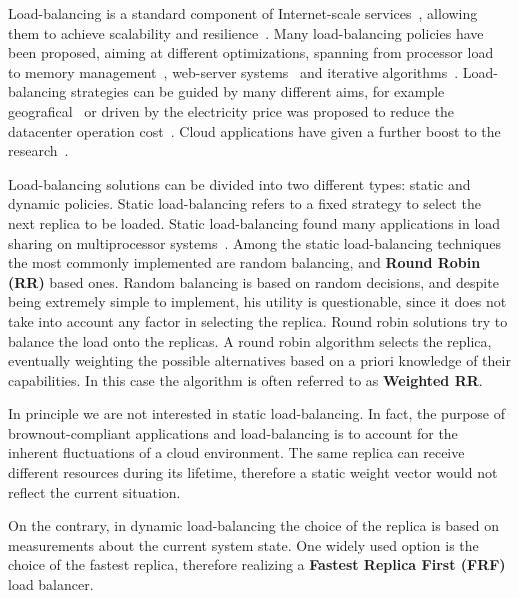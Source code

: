 Load-balancing is a standard component of Internet-scale 
services~\cite{WangOSDI}, allowing them to achieve scalability and
resilience~\citep{Barroso09,Hamilton07:LISA,clusteredbalancing}. Many
load-balancing policies have been proposed, aiming at different
optimizations, spanning from processor load~\cite{Stankovic:TC} to
memory management~\cite{PattersonMemoryLB,MemoryLBACC}, web-server
systems~\cite{Cardellini2003} and iterative 
algorithms~\cite{BahiIterative}. Load-balancing strategies can be 
guided by many different aims, for example
geografical~\cite{GeograficalSASO,geographicalwanbalancing} or driven
by the electricity price was proposed to reduce the datacenter
operation cost~\cite{LoadBalancingForElectricity:TCC}. Cloud
applications have given a further boost to the
research~\citep{Barroso09,Lu11:PerfEval,Lin12:IGCC}.


Load-balancing solutions can be divided into two different types:
static and dynamic policies. Static load-balancing refers to a fixed
strategy to select the next replica to be loaded. Static
load-balancing found many applications in load sharing on
multiprocessor
systems~\cite{StaticLoadBalancing:TSE,StaticOptimal:ACM}. Among the
static load-balancing techniques the most commonly implemented are
random balancing, and \textbf{Round Robin (RR)} based ones. Random
balancing is based on random decisions, and despite being extremely
simple to implement, his utility is questionable, since it does not
take into account any factor in selecting the replica. Round robin
solutions try to balance the load onto the replicas. A round robin
algorithm selects the replica, eventually weighting the possible
alternatives based on a priori knowledge of their capabilities. In
this case the algorithm is often referred to as \textbf{Weighted RR}.

In principle we are not interested in static load-balancing. In fact,
the purpose of brownout-compliant applications and load-balancing is
to account for the inherent fluctuations of a cloud environment. The
same replica can receive different resources during its lifetime,
therefore a static weight vector would not reflect the current
situation.

On the contrary, in dynamic load-balancing the choice of the replica
is based on measurements about the current system state. One widely
used option is the choice of the fastest replica, therefore realizing
a \textbf{Fastest Replica First (FRF)} load balancer.

